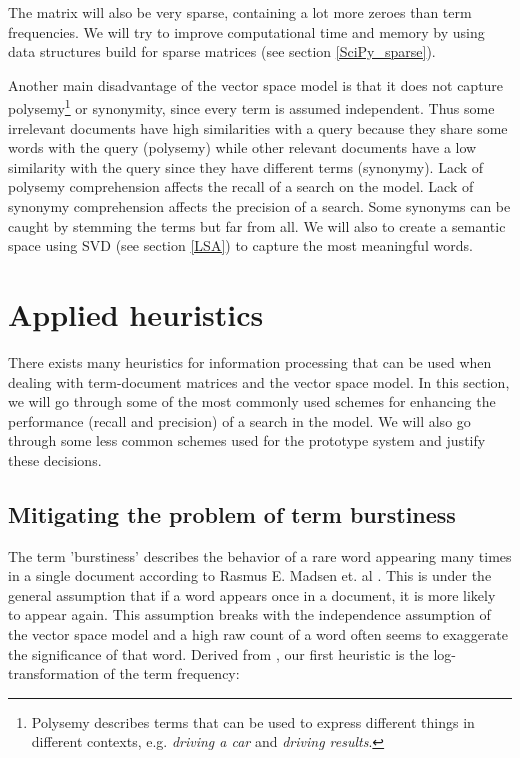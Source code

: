 The matrix will also be very sparse, containing a lot more zeroes than
term frequencies. We will try to improve computational time and memory
by using data structures build for sparse matrices (see section
\ref{SciPy_sparse}). 

Another main disadvantage of the vector space model is that it does
not capture polysemy\footnote{Polysemy describes terms that can be
  used to express different things in different contexts,
  e.g. \textit{driving a car} and \textit{driving results}. } or
synonymity, since every term is assumed independent. Thus some
irrelevant documents have high similarities with a query because they
share some words with the query (polysemy) while other relevant
documents have a low similarity with the query since they have
different terms (synonymy).  Lack of polysemy comprehension affects
the recall of a search on the model. Lack of synonymy comprehension
affects the precision of a search. Some synonyms can be caught by
stemming the terms but far from all. We will also to create a
semantic space using SVD (see section \ref{LSA}) to capture the most
meaningful words.

\section{Applied heuristics}

There exists many heuristics for information processing that can be
used when dealing with term-document matrices and the vector space
model. In this section, we will go through some of the most commonly
used schemes for enhancing the performance (recall and precision) of a
search in the model. We will also go through some less common schemes
used for the prototype system and justify these decisions.

\subsection{Mitigating the problem of term burstiness\label{MitigatingBurstiness}}

The term 'burstiness' describes the behavior of a rare word appearing
many times in a single document according to Rasmus E. Madsen et. al
\cite{ModelingWordBurstiness2005}. This is under the general
assumption that if a word appears once in a document, it is more
likely to appear again. This assumption breaks with the independence
assumption of the vector space model and a high raw count of a word
often seems to exaggerate the significance of that word. Derived from
\cite{ModelingWordBurstiness2005}, our first heuristic is the
log-transformation of the term frequency:

